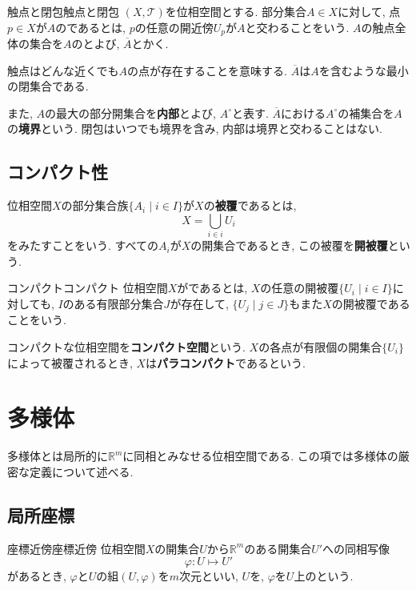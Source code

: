 \documentclass[../main.tex]{subfiles}
\begin{document}
        \begin{dfn}{触点と閉包}{触点と閉包}
            $(X,\mathcal{T})$を位相空間とする. 部分集合$A \in X$に対して, 点$p \in X$が$A$のであるとは, $p$の任意の開近傍$U_p$が$A$と交わることをいう.
            $A$の触点全体の集合を$A$のとよび, $\overline{A}$とかく.
        \end{dfn}
        触点はどんな近くでも$A$の点が存在することを意味する. $\overline{A}$は$A$を含むような最小の閉集合である.

        また, $A$の最大の部分開集合を\textbf{内部}とよび, $A^\circ$と表す. $\overline{A}$における$A^\circ$の補集合を$A$の\textbf{境界}という.
        閉包はいつでも境界を含み, 内部は境界と交わることはない.

    \subsection{コンパクト性}
        位相空間$X$の部分集合族$\{A_i \mid i \in I\}$が$X$の\textbf{被覆}であるとは,
        \begin{equation}
            X = \bigcup_{i \in i}U_i
        \end{equation}
        をみたすことをいう. すべての$A_i$が$X$の開集合であるとき, この被覆を\textbf{開被覆}という.
        \begin{dfn}{コンパクト}{コンパクト}
            位相空間$X$がであるとは, $X$の任意の開被覆$\{U_i \mid i \in I\}$に対しても, $I$のある有限部分集合$J$が存在して, $\{U_j \mid j \in J\}$もまた$X$の開被覆であることをいう.
        \end{dfn}
        コンパクトな位相空間を\textbf{コンパクト空間}という. $X$の各点が有限個の開集合$\{U_i\}$によって被覆されるとき, $X$は\textbf{パラコンパクト}であるという.

\section{多様体}
    多様体とは局所的に$\mathbb{R}^m$に同相とみなせる位相空間である.
    この項では多様体の厳密な定義について述べる.
    \subsection{局所座標}
        \begin{dfn}{座標近傍}{座標近傍}
            位相空間$X$の開集合$U$から$\mathbb{R}^m$のある開集合$U'$への同相写像
            \begin{equation}
                \varphi : U \mapsto U'
            \end{equation}
            があるとき, $\varphi$と$U$の組$(U,\varphi)$を$m$次元といい,
            $U$を, $\varphi$を$U$上のという.
        \end{dfn}
\end{document}
